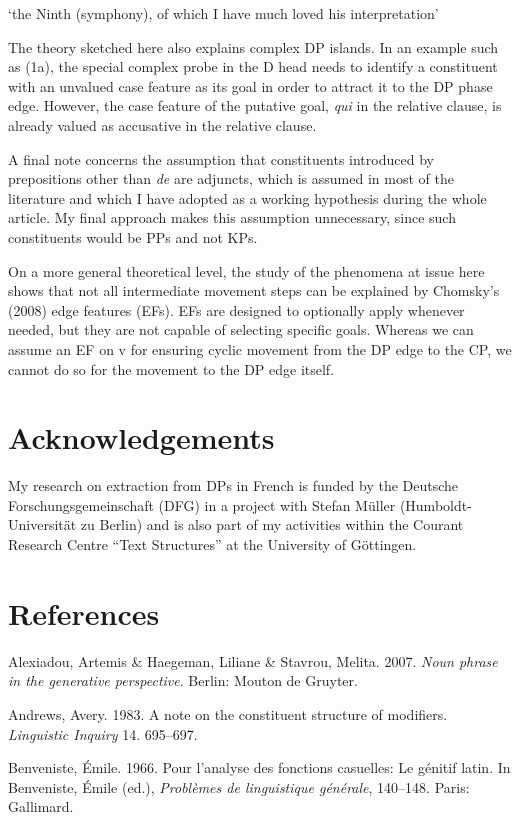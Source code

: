 \documentclass[output=paper]{langsci/langscibook}
\begin{document}
    ‘the Ninth (symphony), of which I have much loved his interpretation’

The theory sketched here also explains complex DP islands. In an example such as (1a), the special complex probe in the D head needs to identify a constituent with an unvalued case feature as its goal in order to attract it to the DP phase edge. However, the case feature of the putative goal, \textit{qui} in the relative clause, is already valued as accusative in the relative clause.

  A final note concerns the assumption that constituents introduced by prepositions other than \textit{de} are adjuncts, which is assumed in most of the literature and which I have adopted as a working hypothesis during the whole article. My final approach makes this assumption unnecessary, since such constituents would be PPs and not KPs.

  On a more general theoretical level, the study of the phenomena at issue here shows that not all intermediate movement steps can be explained by Chomsky’s (2008) edge features (EFs). EFs are designed to optionally apply whenever needed, but they are not capable of selecting specific goals. Whereas we can assume an EF on v for ensuring cyclic movement from the DP edge to the CP, we cannot do so for the movement to the DP edge itself.

\section{ Acknowledgements}

My research on extraction from DPs in French is funded by the Deutsche Forschungsgemeinschaft (DFG) in a project with Stefan Müller (Humboldt-Universität zu Berlin) and is also part of my activities within the Courant Research Centre “Text Structures” at the University of Göttingen.

\section{ References}

Alexiadou, Artemis \& Haegeman, Liliane \& Stavrou, Melita. 2007. \textit{Noun phrase in the generative perspective}. Berlin: Mouton de Gruyter.

Andrews, Avery. 1983. A note on the constituent structure of modifiers. \textit{Linguistic Inquiry} 14. 695–697.

Benveniste, Émile. 1966. Pour l’analyse des fonctions casuelles: Le génitif latin. In Benveniste, Émile (ed.), \textit{Problèmes de linguistique générale}, 140–148. Paris: Gallimard.
\end{document}
